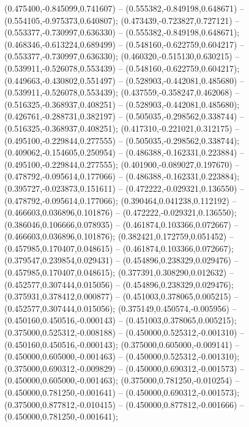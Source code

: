  (0.475400,-0.845099,0.741607) -- (0.555382,-0.849198,0.648671) -- (0.554105,-0.975373,0.640807);
 (0.473439,-0.723827,0.727121) -- (0.553377,-0.730997,0.636330) -- (0.555382,-0.849198,0.648671);
 (0.468346,-0.613224,0.689499) -- (0.548160,-0.622759,0.604217) -- (0.553377,-0.730997,0.636330);
 (0.460320,-0.515130,0.630215) -- (0.539911,-0.526078,0.553439) -- (0.548160,-0.622759,0.604217);
 (0.449663,-0.430802,0.551497) -- (0.528903,-0.442081,0.485680) -- (0.539911,-0.526078,0.553439);
 (0.437559,-0.358247,0.462068) -- (0.516325,-0.368937,0.408251) -- (0.528903,-0.442081,0.485680);
 (0.426761,-0.288731,0.382197) -- (0.505035,-0.298562,0.338744) -- (0.516325,-0.368937,0.408251);
 (0.417310,-0.221021,0.312175) -- (0.495100,-0.229844,0.277555) -- (0.505035,-0.298562,0.338744);
 (0.409062,-0.154605,0.250954) -- (0.486388,-0.162331,0.223884) -- (0.495100,-0.229844,0.277555);
 (0.401900,-0.089027,0.197670) -- (0.478792,-0.095614,0.177066) -- (0.486388,-0.162331,0.223884);
 (0.395727,-0.023873,0.151611) -- (0.472222,-0.029321,0.136550) -- (0.478792,-0.095614,0.177066);
 (0.390464,0.041238,0.112192) -- (0.466603,0.036896,0.101876) -- (0.472222,-0.029321,0.136550);
 (0.386046,0.106666,0.078935) -- (0.461874,0.103366,0.072667) -- (0.466603,0.036896,0.101876);
 (0.382421,0.172759,0.051452) -- (0.457985,0.170407,0.048615) -- (0.461874,0.103366,0.072667);
 (0.379547,0.239854,0.029431) -- (0.454896,0.238329,0.029476) -- (0.457985,0.170407,0.048615);
 (0.377391,0.308290,0.012632) -- (0.452577,0.307444,0.015056) -- (0.454896,0.238329,0.029476);
 (0.375931,0.378412,0.000877) -- (0.451003,0.378065,0.005215) -- (0.452577,0.307444,0.015056);
 (0.375149,0.450574,-0.005956) -- (0.450160,0.450516,-0.000143) -- (0.451003,0.378065,0.005215);
 (0.375000,0.525312,-0.008188) -- (0.450000,0.525312,-0.001310) -- (0.450160,0.450516,-0.000143);
 (0.375000,0.605000,-0.009141) -- (0.450000,0.605000,-0.001463) -- (0.450000,0.525312,-0.001310);
 (0.375000,0.690312,-0.009829) -- (0.450000,0.690312,-0.001573) -- (0.450000,0.605000,-0.001463);
 (0.375000,0.781250,-0.010254) -- (0.450000,0.781250,-0.001641) -- (0.450000,0.690312,-0.001573);
 (0.375000,0.877812,-0.010415) -- (0.450000,0.877812,-0.001666) -- (0.450000,0.781250,-0.001641);

